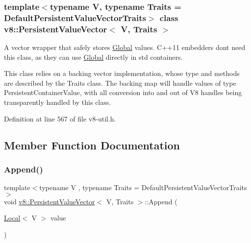 \subsubsection*{template$<$typename V, typename Traits = Default\+Persistent\+Value\+Vector\+Traits$>$\newline
class v8\+::\+Persistent\+Value\+Vector$<$ V, Traits $>$}

A vector wrapper that safely stores \mbox{\hyperlink{classv8_1_1Global}{Global}} values. C++11 embedders don\textquotesingle{}t need this class, as they can use \mbox{\hyperlink{classv8_1_1Global}{Global}} directly in std containers.

This class relies on a backing vector implementation, whose type and methods are described by the Traits class. The backing map will handle values of type Persistent\+Container\+Value, with all conversion into and out of V8 handles being transparently handled by this class. 

Definition at line 567 of file v8-\/util.\+h.



\subsection{Member Function Documentation}
\mbox{\label{classv8_1_1PersistentValueVector_a02376c6d16be29084db46f65473477fb}} 
\subsubsection{\texorpdfstring{Append()}{Append()}\hspace{0.1cm}{\footnotesize\ttfamily [1/2]}}
{\footnotesize\ttfamily template$<$typename V , typename Traits  = Default\+Persistent\+Value\+Vector\+Traits$>$ \\
void \mbox{\hyperlink{classv8_1_1PersistentValueVector}{v8\+::\+Persistent\+Value\+Vector}}$<$ V, Traits $>$\+::Append (\begin{DoxyParamCaption}\item[{\mbox{\hyperlink{classv8_1_1Local}{Local}}$<$ V $>$}]{value }\end{DoxyParamCaption})\hspace{0.3cm}{\ttfamily [inline]}}

